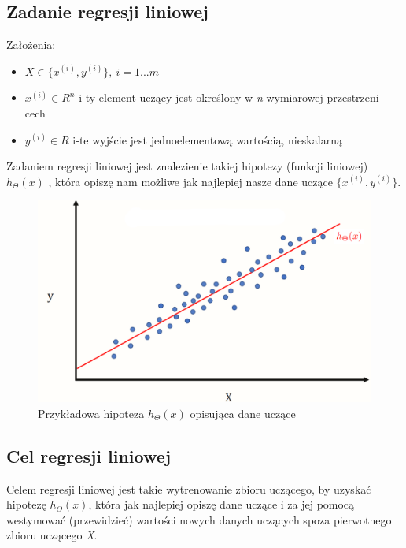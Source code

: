 \documentclass{article}
\begin{document}
\subsection{Zadanie regresji liniowej}
Założenia:
\begin{itemize}
  \item$X \in \{x^{(i)}, y^{(i)}\},\ i=1...m$
  \item$x^{(i)} \in R^n$ i-ty element uczący jest określony w \emph{n} wymiarowej przestrzeni cech
  \item$y^{(i)} \in R$ i-te wyjście jest jednoelementową wartością, nieskalarną
\end{itemize}

Zadaniem regresji liniowej jest znalezienie takiej hipotezy (funkcji liniowej) $h_\Theta(x)$ , która opiszę nam możliwe jak najlepiej nasze dane uczące $\{x^{(i)}, y^{(i)}\}$.
\begin{figure}[h]
\caption{Przykładowa hipoteza $h_\Theta(x)$ opisująca dane uczące}
\includegraphics[scale=0.3]{linearRegression}
\end{figure}
\subsection{Cel regresji liniowej}
Celem regresji liniowej jest takie wytrenowanie zbioru uczącego, by uzyskać hipotezę $h_\Theta(x)$, która jak najlepiej opiszę dane uczące i za jej pomocą westymować (przewidzieć) wartości nowych danych uczących spoza pierwotnego zbioru uczącego \emph{X}.
\end{document}
